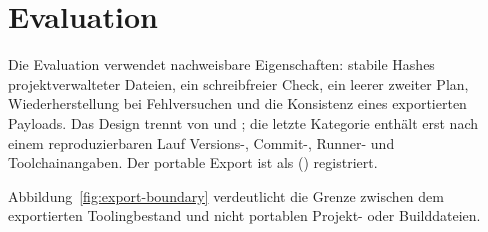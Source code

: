 \section{Evaluation}
\label{chap:evaluation}

Die Evaluation verwendet nachweisbare Eigenschaften: stabile Hashes
projektverwalteter Dateien, ein schreibfreier Check, ein leerer zweiter Plan,
Wiederherstellung bei Fehlversuchen und die Konsistenz eines exportierten Payloads. Das
Design trennt \Implemented{} von \Verified{} und \Measured{}; die letzte Kategorie
enthält erst nach einem reproduzierbaren Lauf Versions-, Commit-, Runner- und
Toolchainangaben. Der portable Export ist als \Verified{}
() registriert.

Abbildung~\ref{fig:export-boundary} verdeutlicht die Grenze zwischen dem exportierten
Toolingbestand und nicht portablen Projekt- oder Builddateien.

